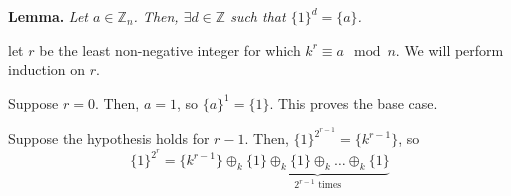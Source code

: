 \documentclass{article}
\newcommand{\zee}{\mathbb{Z}}
\begin{document}
\textbf{Lemma.} \textit{Let $a \in \zee_n$.
Then, $\exists d \in \zee$
such that $\{1\}^d = \{a\}$.}

let $r$ be the least
non-negative integer for which $k^r \equiv a \mod n$.
We will perform induction on $r$.

Suppose $r = 0$. Then,
$a = 1$, so $\{a\}^1 = \{1\}$. This proves the base case.

Suppose the hypothesis holds for $r - 1$. Then,
$\{1\}^{2^{r-1}} = \{k^{r-1}\}$,
so
\[\{1\}^{2^r} = \{k^{r-1}\} \oplus_k \underbrace{
    \{1\} \oplus_k \{1\} \oplus_k \ldots \oplus_k \{1\}}
_{2^{r-1}\text{ times}}\]
\end{document}
